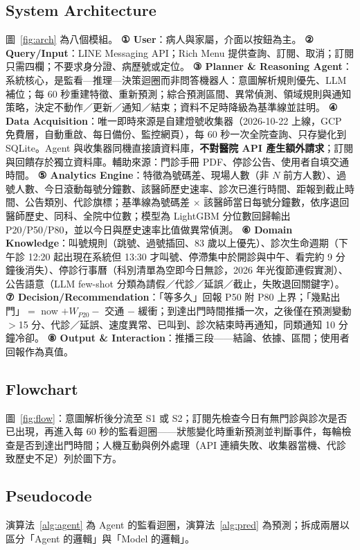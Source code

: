 \documentclass[11pt,twocolumn]{article}
\begin{document}
\subsection{System Architecture}
圖~\ref{fig:arch} 為八個模組。
\textbf{① User}：病人與家屬，介面以按鈕為主。
\textbf{② Query/Input}：LINE Messaging API；Rich Menu 提供查詢、訂閱、取消；訂閱只需四欄；不要求身分證、病歷號或定位。
\textbf{③ Planner \& Reasoning Agent}：系統核心，是監看—推理—決策迴圈而非問答機器人：意圖解析規則優先、LLM 補位；每 60 秒重建特徵、重新預測；綜合預測區間、異常偵測、領域規則與通知策略，決定不動作／更新／通知／結束；資料不足時降級為基準線並註明。
\textbf{④ Data Acquisition}：唯一即時來源是自建燈號收集器（2026-10-22 上線，GCP 免費層，自動重啟、每日備份、監控網頁），每 60 秒一次全院查詢、只存變化到 SQLite。Agent 與收集器同機直接讀資料庫，\textbf{不對醫院 API 產生額外請求}；訂閱與回饋存於獨立資料庫。輔助來源：門診手冊 PDF、停診公告、使用者自填交通時間。
\textbf{⑤ Analytics Engine}：特徵為號碼差、現場人數（非 $N$ 前方人數）、過號人數、今日滾動每號分鐘數、該醫師歷史速率、診次已進行時間、距報到截止時間、公告類別、代診旗標；基準線為號碼差 $\times$ 該醫師當日每號分鐘數，依序退回醫師歷史、同科、全院中位數；模型為 LightGBM 分位數回歸輸出 P20/P50/P80，並以今日與歷史速率比值做異常偵測。
\textbf{⑥ Domain Knowledge}：叫號規則（跳號、過號插回、83 歲以上優先）、診次生命週期（下午診 12:20 起出現在系統但 13:30 才叫號、停滯集中於開診與中午、看完約 9 分鐘後消失）、停診行事曆（科別清單為空即今日無診，2026 年光復節連假實測）、公告語意（LLM few-shot 分類為請假／代診／延誤／截止，失敗退回關鍵字）。
\textbf{⑦ Decision/Recommendation}：「等多久」回報 P50 附 P80 上界；「幾點出門」$=$ now $+ W_{P20} -$ 交通 $-$ 緩衝；到達出門時間推播一次，之後僅在預測變動 $>$15 分、代診／延誤、速度異常、已叫到、診次結束時再通知，同類通知 10 分鐘冷卻。
\textbf{⑧ Output \& Interaction}：推播三段——結論、依據、區間；使用者回報作為真值。

\subsection{Flowchart}
圖~\ref{fig:flow}：意圖解析後分流至 S1 或 S2；訂閱先檢查今日有無門診與診次是否已出現，再進入每 60 秒的監看迴圈——狀態變化時重新預測並判斷事件，每輪檢查是否到達出門時間；人機互動與例外處理（API 連續失敗、收集器當機、代診致歷史不足）列於圖下方。

\subsection{Pseudocode}
演算法~\ref{alg:agent} 為 Agent 的監看迴圈，演算法~\ref{alg:pred} 為預測；拆成兩層以區分「Agent 的邏輯」與「Model 的邏輯」。
\end{document}
